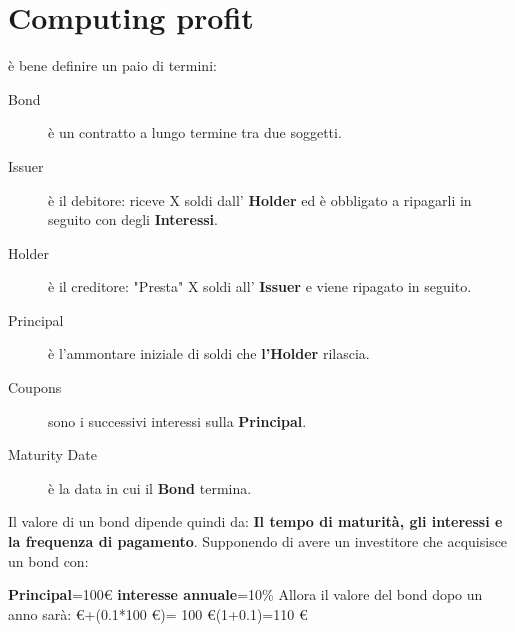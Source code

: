 \documentclass[a4paper,11pt]{report}
\begin{document}
{%
\section{Computing profit}
è bene definire un paio di termini:
\begin {description}
\item[Bond] è un contratto a lungo termine tra due soggetti.
\item[Issuer] è il debitore: riceve X soldi dall' {\bfseries Holder} ed è obbligato a ripagarli in seguito con degli {\bfseries Interessi}.
\item[Holder] è il creditore: "Presta" X soldi all' {\bfseries Issuer} e viene ripagato in seguito.
\item[Principal] è l'ammontare iniziale di soldi che {\bfseries l'Holder} rilascia.
\item[Coupons] sono i successivi interessi sulla {\bfseries Principal}.
\item[Maturity Date] è la data in cui il {\bfseries Bond} termina.
\end {description}
Il valore di un bond dipende quindi da:  {\bfseries Il tempo di maturità, gli interessi e la frequenza di pagamento}. \newline
Supponendo di avere un investitore che acquisisce un bond con: 
\begin{center}
\textbf{Principal}=100\euro \newline
\textbf{interesse annuale}=10\% \newline
Allora il valore del bond dopo un anno sarà: \euro+(0.1*100 \euro)= 100 \euro *(1+0.1)=110 \euro
\end{center}
\newpage

}
\end{document}
